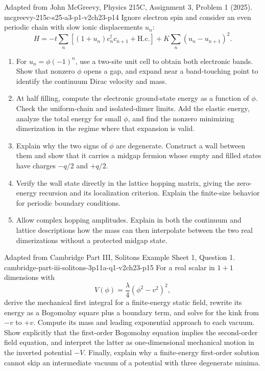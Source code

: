 \begin{enumerate}
  {Adapted from John McGreevy, Physics 215C, Assignment 3, Problem 1 (2025).}
  {mcgreevy-215c-s25-a3-p1-v2ch23-p14}
  Ignore electron spin and consider an even periodic chain with slow ionic
  displacements \(u_n\):
  \[
    H=-t\sum_n\left[(1+u_n)c_n^\dagger c_{n+1}
      +\mathrm{H.c.}\right]
      +K\sum_n(u_n-u_{n+1})^2 .
  \]
  \begin{enumerate}
    \item[(a)] For \(u_n=\phi(-1)^n\), use a two-site unit cell to obtain
      both electronic bands.  Show that nonzero \(\phi\) opens a gap, and
      expand near a band-touching point to identify the continuum Dirac
      velocity and mass.
    \item[(b)] At half filling, compute the electronic ground-state energy
      as a function of \(\phi\).  Check the uniform-chain and isolated-dimer
      limits.  Add the elastic energy, analyze the total energy for small
      \(\phi\), and find the nonzero minimizing dimerization in the regime
      where that expansion is valid.
    \item[(c)] Explain why the two signs of \(\phi\) are degenerate.
      Construct a wall between them and show that it carries a midgap
      fermion whose empty and filled states have charges
      \(-q/2\) and \(+q/2\).
    \item[(d)] Verify the wall state directly in the lattice hopping
      matrix, giving the zero-energy recursion and its localization
      criterion.  Explain the finite-size behavior for periodic boundary
      conditions.
    \item[(e)] Allow complex hopping amplitudes.  Explain in both the
      continuum and lattice descriptions how the mass can then interpolate
      between the two real dimerizations without a protected midgap state.
  \end{enumerate}

  {Adapted from Cambridge Part III, Solitons Example Sheet 1, Question 1.}
  {cambridge-part-iii-solitons-3p11a-q1-v2ch23-p15}
  For a real scalar in \(1+1\) dimensions with
  \[
    V(\phi)=\frac{\lambda}{4}(\phi^2-v^2)^2,
  \]
  derive the mechanical first integral for a finite-energy static field,
  rewrite its energy as a Bogomolny square plus a boundary term, and solve
  for the kink from \(-v\) to \(+v\).  Compute its mass and leading
  exponential approach to each vacuum.  Show explicitly that the
  first-order Bogomolny equation implies the second-order field equation,
  and interpret the latter as one-dimensional mechanical motion in the
  inverted potential \(-V\).  Finally, explain why a finite-energy
  first-order solution cannot skip an intermediate vacuum of a potential
  with three degenerate minima.


\end{enumerate}
